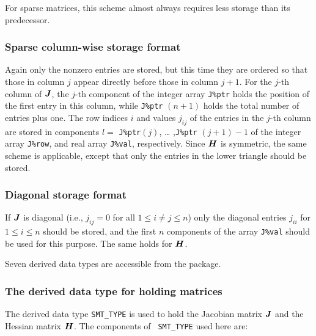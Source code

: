 \documentclass{galahad}
\begin{document}
For sparse matrices, this scheme almost always requires less storage than 
its predecessor.

\subsubsection{Sparse column-wise storage format}\label{columnwise}
Again only the nonzero entries are stored, but this time they are
ordered so that those in column $j$ appear directly before those in column
$j+1$. For the $j$-th column of ${\bm{J}}$, the $j$-th component of the integer
array {\tt J\%ptr} holds the position of the first entry in this column,
while {\tt J\%ptr} $(n+1)$ holds the total number of entries plus one.
The row indices $i$ and values $j_{ij}$ of the entries in the
$j$-th column are stored in components $l =$ {\tt J\%ptr}$(j)$, \ldots
,{\tt J\%ptr} $(j+1)-1$ of the integer array {\tt J\%row}, and real
array {\tt J\%val}, respectively.  Since ${\bm{H}}$ is symmetric, the same
scheme is applicable, except that only the entries in the lower
triangle should be stored.

\subsubsection{Diagonal storage format}\label{diagonal}
If ${\bm{J}}$ is diagonal (i.e., $j_{ij} = 0$ for all $1 \leq i \neq j
\leq n$) only the diagonal entries $j_{ii}$ for $1 \leq i \leq n$ should
be stored, and the first $n$ components of the array {\tt J\%val}
should be used for this purpose.  The same holds for ${\bm{H}}$.





\galtypes
Seven derived data types are accessible from the package.


\subsubsection{The derived data type for holding matrices}\label{typesmt}
The derived data type {\tt SMT\_TYPE} is used to hold the Jacobian
matrix ${\bm{J}}$ and the Hessian matrix ${\bm{H}}$. The components of {\tt
  SMT\_TYPE} used here are:
\end{document}
